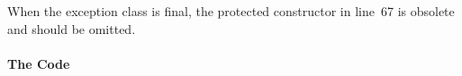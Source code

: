 When the exception class is final, the protected constructor in line~67 is obsolete and should be omitted.


\paragraph{The Code} \



